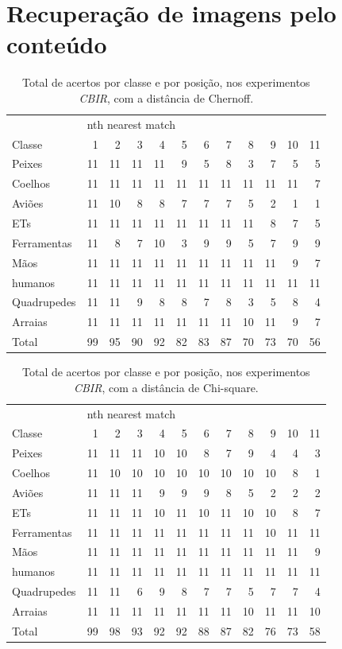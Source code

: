 \section{Recuperação de imagens pelo conteúdo}

\begin{table}
\centering
\caption{\label{tab:KimiaChernoff} Total de acertos por classe e por posição, nos experimentos \emph{CBIR}, com a distância de Chernoff.}
\begin{tabular}{l| r r r r r r r r r r r}
\hline
&\multicolumn{11}{l}{nth nearest match} \\
\cline{2-12}
Classe&1&2&3&4&5&6&7&8&9&10&11 \\
 \hline
Peixes&11&11&11&11&9&5&8&3&7&5&5\\
Coelhos&11&11&11&11&11&11&11&11&11&11&7\\ 
Aviões&11&10&8&8&7&7&7&5&2&1&1\\
ETs&11&11&11&11&11&11&11&11&8&7&5\\
Ferramentas&11&8&7&10&3&9&9&5&7&9&9\\
Mãos&11&11&11&11&11&11&11&11&11&9&7\\
humanos&11&11&11&11&11&11&11&11&11&11&11\\
Quadrupedes&11&11&9&8&8&7&8&3&5&8&4\\
Arraias&11&11&11&11&11&11&11&10&11&9&7\\
\hline
Total&99&95&90&92&82&83&87&70&73&70&56\\
\hline
\end{tabular}
\end{table}

\begin{table}
\centering
\caption{\label{tab:KimiaChi-square} Total de acertos por classe e por posição, nos experimentos \emph{CBIR}, com a distância de Chi-square.}
\begin{tabular}{l| r r r r r r r r r r r}
\hline
&\multicolumn{11}{l}{nth nearest match} \\
\cline{2-12}
Classe&1&2&3&4&5&6&7&8&9&10&11 \\
 \hline
Peixes&11&11&11&10&10&8&7&9&4&4&3\\
Coelhos&11&10&10&10&10&10&10&10&10&8&1\\ 
Aviões&11&11&11&9&9&9&8&5&2&2&2\\
ETs&11&11&11&10&11&10&11&10&10&8&7\\
Ferramentas&11&11&11&11&11&11&11&11&10&11& 11\\
Mãos&11&11&11&11&11&11&11&11&11&11&9\\
humanos&11&11&11&11&11&11&11&11&11&11&11\\
Quadrupedes&11&11&6&9&8&7&7&5&7&7&4\\
Arraias&11&11&11&11&11&11&11&10&11&11&10\\
\hline
Total&99&98&93&92&92&88&87&82&76&73&58\\
\hline
\end{tabular}
\end{table}

